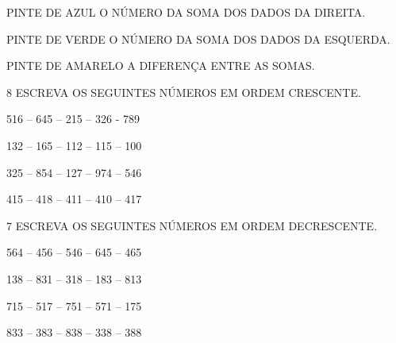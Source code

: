 \begin{escolha}[itemsep=-5pt]
\item PINTE DE AZUL O NÚMERO DA SOMA DOS DADOS DA DIREITA.

\item PINTE DE VERDE O NÚMERO DA SOMA DOS DADOS DA ESQUERDA.

\item PINTE DE AMARELO A DIFERENÇA ENTRE AS SOMAS.
\end{escolha}


\num{8} ESCREVA OS SEGUINTES NÚMEROS EM ORDEM CRESCENTE.

\begin{escolha}
\item 516 -- 645 -- 215 -- 326 - 789


\item 132 -- 165 -- 112 -- 115 -- 100


\item 325 -- 854 -- 127 -- 974 -- 546


\item 415 -- 418 -- 411 -- 410 -- 417


\end{escolha}


\num{7} ESCREVA OS SEGUINTES NÚMEROS EM ORDEM DECRESCENTE.

\begin{escolha}
\item 564 -- 456 -- 546 -- 645 -- 465

\item 138 -- 831 -- 318 -- 183 -- 813

\item 715 -- 517 -- 751 -- 571 -- 175

\item 833 -- 383 -- 838 -- 338 -- 388


\end{escolha}

